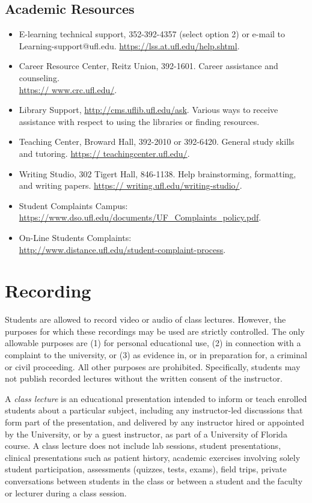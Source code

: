 \documentclass[11pt, article, oneside]{memoir}
\begin{document}
\subsection{Academic Resources}
\begin{itemize}
\item E-learning technical support, 352-392-4357 (select option 2) or e-mail to Learning-support@ufl.edu. \url{https://lss.at.ufl.edu/help.shtml}.
\item Career Resource Center, Reitz Union, 392-1601. Career assistance and counseling. \\\url{https:// www.crc.ufl.edu/}.
\item Library Support, \url{http://cms.uflib.ufl.edu/ask}. Various ways to receive assistance with respect to using the libraries or finding resources.
\item Teaching Center, Broward Hall, 392-2010 or 392-6420. General study skills and tutoring. \url{https:// teachingcenter.ufl.edu/}.
\item Writing Studio, 302 Tigert Hall, 846-1138. Help brainstorming, formatting, and writing papers. \url{https:// writing.ufl.edu/writing-studio/}.
\item Student Complaints Campus: \\\url{https://www.dso.ufl.edu/documents/UF_Complaints_policy.pdf}. 
\item On-Line Students Complaints: \\\url{http://www.distance.ufl.edu/student-complaint-process}.
\end{itemize}

\section{Recording}
Students are allowed to record video or audio of class lectures. However, the purposes for which these recordings may be used are strictly controlled. The only allowable purposes are (1) for personal educational use, (2) in connection with a complaint to the university, or (3) as evidence in, or in preparation for, a criminal or civil proceeding. All other purposes are prohibited. Specifically, students may not publish recorded lectures without the written consent of the instructor.

A \emph{class lecture} is an educational presentation intended to inform or teach enrolled students about a particular subject, including any instructor-led discussions that form part of the presentation, and delivered by any instructor hired or appointed by the University, or by a guest instructor, as part of a University of Florida course. A class lecture does not include lab sessions, student presentations, clinical presentations such as patient history, academic exercises involving solely student participation, assessments (quizzes, tests, exams), field trips, private conversations between students in the class or between a student and the faculty or lecturer during a class session.
\end{document}
